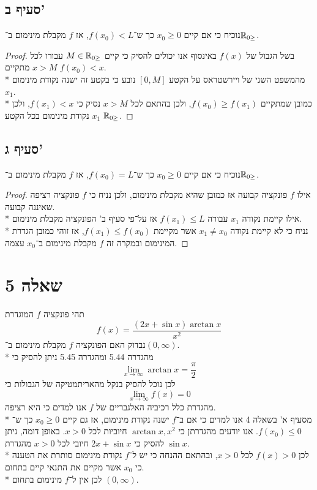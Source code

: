 \subsection{סעיף ב'}
נוכיח כי אם קיים $x_0 \ge 0$ כך ש־$f(x_0) < L$, אז $f$ מקבלת מינימום ב־$\mathbb{R}_{0\ge}$.
\begin{proof}
	בשל הגבול של $f(x)$ באינסוף אנו יכולים להסיק כי קיים $M \in \mathbb{R}_{0\ge}$ עבורו לכל $x > M$ מתקיים $f(x_0) < x$. \\* %
	מהמשפט השני של ויירשטראס על הקטע $[0, M]$ נובע כי בקטע זה ישנה נקודת מינימום $x_1$. \\*
	כמובן שמתקיים $f(x_0) \ge f(x_1)$, ולכן בהתאם לכל $x > M$ נסיק כי $f(x_1) < x$, ולכן $x_1$ נקודת מינימום בכל הקטע $\mathbb{R}_{0\ge}$.
\end{proof}

\subsection{סעיף ג'}
נוכיח כי אם קיים $x_0 \ge 0$ כך ש־$f(x_0) = L$, אז $f$ מקבלת מינימום ב־$\mathbb{R}_{0\ge}$.
\begin{proof}
	אילו $f$ פונקציה קבועה אז כמובן שהיא מקבלת מינימום, ולכן נניח כי $f$ פונקציה רציפה שאיננה קבועה. \\*
	אילו קיימת נקודה $x_1$ עבורה $f(x_1) \le L$ אז על־פי סעיף ב' הפונקציה מקבלת מינימום. \\*
	נניח כי לא קיימת נקודה $x_1 \ne x_0$ אשר מקיימת $f(x_1) \le f(x_0)$, אז זוהי כמובן הגדרת המינימום ובמקרה זה $f$ מקבלת מינימום ב־$x_0$ עצמה.
\end{proof}

\section{שאלה 5}
תהי פונקציה $f$ המוגדרת
\[
	f(x) = \frac{(2x + \sin x) \arctan x}{x^2}
\]
נבדוק האם הפונקציה $f$ מקבלת מינימום ב־$(0, \infty)$. \\*
מהגדרה 5.44 ומהגדרה 5.45 ניתן להסיק כי
\[
	\lim_{x \to \infty} \arctan x = \frac{\pi}{2}
\]
לכן נוכל להסיק בנקל מהאריתמטיקה של הגבולות כי
\[
	\lim_{x \to \infty} f(x) = 0
\]
מהגדרת כלל רכיביה האלגבריים של $f$ אנו למדים כי היא רציפה. \\*
מסעיף א' בשאלה 4 אנו למדים כי אם ב־$f$ ישנה נקודת מינימום, אז גם קיים $x_0 \ge 0$ כך ש־$f(x_0) \le 0$.
אנו יודעים מהגדרתן כי $\arctan x, x^2$ חיוביות לכל $x > 0$. באופן דומה, ניתן להסיק כי $2x + \sin x$ חיובי לכל $x > 0$ מהגדרת $\sin x$. \\*
לכן $f(x) > 0$ לכל $x > 0$, ובהתאם ההנחה כי יש ל־$f$ נקודת מינימום סותרת את הטענה כי $x_0$ אשר מקיים את התנאי קיים בתחום. \\*
לכן אין ל־$f$ מינימום בתחום $(0, \infty)$.

